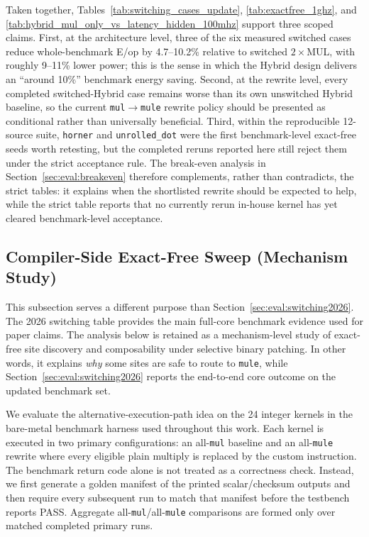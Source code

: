 Taken together,
Tables~\ref{tab:switching_cases_update}, \ref{tab:exactfree_1ghz}, and
\ref{tab:hybrid_mul_only_vs_latency_hidden_100mhz} support three scoped
claims. First, at the architecture level, three of the six measured
switched cases reduce whole-benchmark E/op by 4.7--10.2\% relative to
switched $2\!\times\!$MUL, with roughly 9--11\% lower power; this is the
sense in which the Hybrid design delivers an ``around 10\%'' benchmark
energy saving. Second, at the rewrite level, every completed
switched-Hybrid case remains worse than its own unswitched Hybrid
baseline, so the current \texttt{mul}$\rightarrow$\texttt{mule} rewrite
policy should be presented as conditional rather than universally
beneficial. Third, within the reproducible 12-source suite,
\texttt{horner} and \texttt{unrolled\_dot} were the first
benchmark-level exact-free seeds worth retesting, but the completed
reruns reported here still reject them under the strict acceptance rule.
The break-even analysis in Section~\ref{sec:eval:breakeven} therefore
complements, rather than contradicts, the strict tables: it explains
when the shortlisted rewrite should be expected to help, while the strict
table reports that no currently rerun in-house kernel has yet cleared
benchmark-level acceptance.

\subsection{Compiler-Side Exact-Free Sweep (Mechanism Study)}\label{sec:eval:bench}

This subsection serves a different purpose than
Section~\ref{sec:eval:switching2026}. The 2026 switching table provides
the main full-core benchmark evidence used for paper claims. The analysis
below is retained as a mechanism-level study of exact-free site discovery
and composability under selective binary patching. In other words, it
explains \emph{why} some sites are safe to route to \texttt{mule}, while
Section~\ref{sec:eval:switching2026} reports the end-to-end core outcome
on the updated benchmark set.

We evaluate the alternative-execution-path idea on the 24 integer
kernels in the bare-metal benchmark harness used throughout this
work. Each kernel is executed in two primary configurations: an
all-\texttt{mul} baseline and an all-\texttt{mule} rewrite where every
eligible plain multiply is replaced by the custom instruction. The
benchmark return code alone is not treated as a correctness check.
Instead, we first generate a golden manifest of the printed
scalar/checksum outputs and then require every subsequent run to match
that manifest before the testbench reports PASS. Aggregate
all-\texttt{mul}/all-\texttt{mule} comparisons are formed only over
matched completed primary runs.

